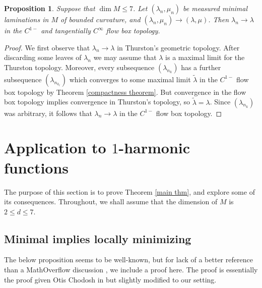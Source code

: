 \documentclass[reqno,11pt]{amsart}
\newtheorem{proposition}[theorem]{Proposition}
\theoremstyle{definition}
\numberwithin{equation}{section}
\begin{document}
\begin{proposition}\label{convergence of traansverse measures means flow box convergence}
Suppose that $\dim M \leq 7$.
Let $(\lambda_n, \mu_n)$ be measured minimal laminations in $M$ of bounded curvature, and $(\lambda_n, \mu_n) \to (\lambda, \mu)$.
Then $\lambda_n \to \lambda$ in the $C^{1-}$ and tangentially $C^\infty$ flow box topology.
\end{proposition}
\begin{proof}
We first observe that $\lambda_n \to \lambda$ in Thurston's geometric topology.
After discarding some leaves of $\lambda_n$ we may assume that $\lambda$ is a maximal limit for the Thurston topology.
Moreover, every subsequence $(\lambda_{n_k})$ has a further subsequence $(\lambda_{n_{k_\ell}})$ which converges to some maximal limit $\tilde \lambda$ in the $C^{1-}$ flow box topology by Theorem \ref{compactness theorem}.
But convergence in the flow box topology implies convergence in Thurston's topology, so $\tilde \lambda = \lambda$.
Since $(\lambda_{n_k})$ was arbitrary, it follows that $\lambda_n \to \lambda$ in the $C^{1-}$ flow box topology.
\end{proof}


\section{Application to \texorpdfstring{$1$-harmonic}{one-harmonic} functions}\label{1harmonic sec}
The purpose of this section is to prove Theorem \ref{main thm}, and explore some of its consequences.
Throughout, we shall assume that the dimension of $M$ is $2 \leq d \leq 7$.

\subsection{Minimal implies locally minimizing}
The below proposition seems to be well-known, but for lack of a better reference than a MathOverflow discussion \cite{MathOverflowMinimalLocal}, we include a proof here.
The proof is essentially the proof given Otis Chodosh in \cite{MathOverflowMinimalLocal} but slightly modified to our setting.
\end{document}
